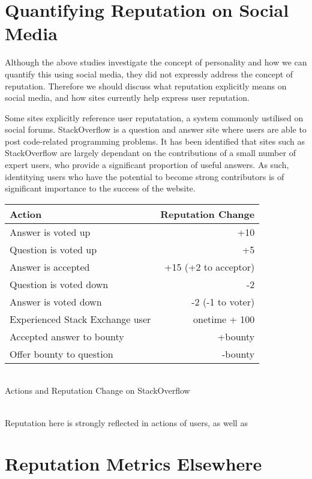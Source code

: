 \section{Quantifying Reputation on Social Media}

Although the above studies investigate the concept of personality and how we can quantify this using social media, they did not expressly address the concept of reputation. Therefore we should discuss what reputation explicitly means on social media, and how sites currently help express user reputation. 

Some sites explicitly reference user reputatation, a system commonly ustilised on social forums. StackOverflow is a question and answer site where users are able to post code-related programming problems. It has been identified that sites such as StackOverflow are largely dependant on the contributions of a small number of expert users, who provide a significant proportion of useful answers. As such, identitying users who have the potential to become strong contributors is of significant importance to the success of the website.\\

\begin{tabular}{l|r}
 Action & Reputation Change\\ \hline
 Answer is voted up & +10 \\
 Question is voted up & +5 \\
 Answer is accepted & +15 (+2 to acceptor) \\
 Question is voted down & -2 \\
 Answer is voted down & -2 (-1 to voter) \\
 Experienced Stack Exchange user & onetime + 100 \\
 Accepted answer to bounty & +bounty \\
 Offer bounty to question & -bounty \\ 
\end{tabular}\\

\caption{Actions and Reputation Change on StackOverflow\cite{movshovitzanalysis}}\\

Reputation here is strongly reflected in actions of users, as well as 


\section{Reputation Metrics Elsewhere}

